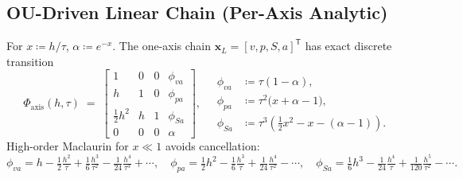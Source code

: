 \documentclass[11pt]{article}
\newcommand{\vect}[1]{\bm{#1}}
\newcommand{\T}{\mathsf{T}}
\begin{document}
\subsection{OU-Driven Linear Chain (Per-Axis Analytic)}
For \(x \coloneqq h/\tau\), \(\alpha \coloneqq e^{-x}\). The one-axis chain
\(\vect{x}_L=[v,p,S,a]^\T\) has exact discrete transition
\begin{equation}
  \Phi_{\mathrm{axis}}(h,\tau) \;=\;
  \begin{bmatrix}
    1 & 0 & 0 & \phi_{va} \\
    h & 1 & 0 & \phi_{pa} \\
    \tfrac12 h^2 & h & 1 & \phi_{Sa} \\
    0 & 0 & 0 & \alpha
  \end{bmatrix},
  \quad
  \begin{aligned}
    \phi_{va} &\coloneqq \tau (1-\alpha),\\
    \phi_{pa} &\coloneqq \tau^2 \bigl(x + \alpha - 1\bigr),\\
    \phi_{Sa} &\coloneqq \tau^3 \!\left(\tfrac12 x^2 - x - (\alpha-1)\right).
  \end{aligned}
  \label{eq:Phi-axis}
\end{equation}
High-order Maclaurin for \(x\ll 1\) avoids cancellation:
\begin{equation}
  \phi_{va} = h - \tfrac12 \tfrac{h^2}{\tau} + \tfrac16 \tfrac{h^3}{\tau^2} - \tfrac1{24} \tfrac{h^4}{\tau^3} + \cdots,
  \quad
  \phi_{pa} = \tfrac12 h^2 - \tfrac16 \tfrac{h^3}{\tau} + \tfrac1{24} \tfrac{h^4}{\tau^2} - \cdots,
  \quad
  \phi_{Sa} = \tfrac16 h^3 - \tfrac1{24} \tfrac{h^4}{\tau} + \tfrac1{120} \tfrac{h^5}{\tau^2} - \cdots.
  \label{eq:Phi-axis-series}
\end{equation}
\end{document}
